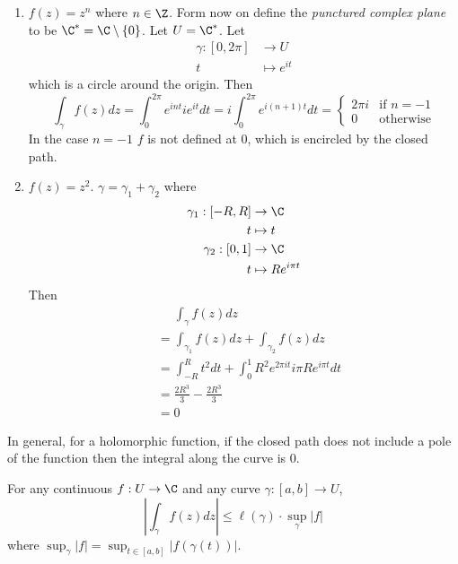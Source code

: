 \documentclass[a4paper]{article}
\begin{document}
\begin{eg}\leavevmode
  \begin{enumerate}
  \item \(f(z) = z^n\) where \(n \in \Z\). Form now on define the \emph{punctured complex plane} to be \(\C^* = \C \setminus \{0\}\). Let \(U = \C^*\). Let
    \begin{align*}
      \gamma: [0, 2\pi] &\to U \\
      t &\mapsto e^{it}
    \end{align*}
    which is a circle around the origin. Then
    \[
      \int_\gamma f(z) dz =
      \int_0^{2\pi} e^{int}ie^{it} dt
      = i\int_0^{2\pi} e^{i(n + 1)t} dt
      =
      \begin{cases}
        2\pi i & \text{if } n = -1 \\
        0 & \text{otherwise}
      \end{cases}
    \]
    In the case \(n = -1\) \(f\) is not defined at \(0\), which is encircled by the closed path.
  \item \(f(z) = z^2\). \(\gamma = \gamma_1 + \gamma_2\) where
    \begin{align*}
      \gamma_1: [-R, R] &\to \C \\
      t &\mapsto t \\
      \gamma_2:[0, 1] &\to \C \\
      t &\mapsto Re^{i\pi t}
    \end{align*}
    Then
    \begin{align*}
      &\phantom{=} \int_\gamma f(z)dz \\
      &= \int_{\gamma_1} f(z)dz + \int_{\gamma_2} f(z) dz \\
      &= \int_{-R}^R t^2dt + \int_0^1 R^2e^{2\pi it}i\pi Re^{i\pi t} dt \\
      &= \frac{2R^3}{3} - \frac{2R^3}{3} \\
      &= 0 
    \end{align*}
  \end{enumerate}
\end{eg}

In general, for a holomorphic function, if the closed path does not include a pole of the function then the integral along the curve is \(0\).

\begin{proposition}
  For any continuous \(f: U \to \C\) and any curve \(\gamma: [a, b] \to U\),
  \[
    \left| \int_\gamma f(z)dz \right| \leq \ell(\gamma) \cdot \sup_\gamma|f|
  \]
  where \(\sup_\gamma |f| = \sup_{t \in [a, b]} |f(\gamma(t))|\).
\end{proposition}
\end{document}
